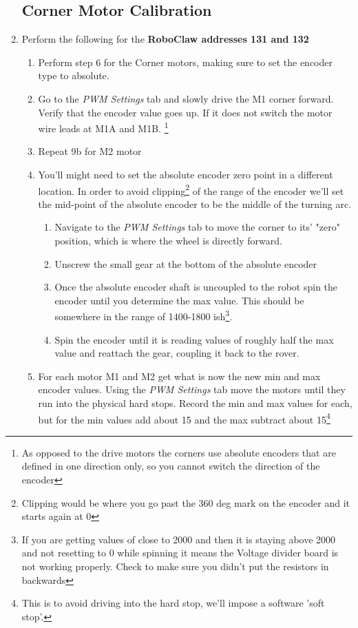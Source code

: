 \documentclass[12pt]{article}
\begin{document}
\begin{enumerate}
\subsection{Corner Motor Calibration}
	\item Perform the following for the \textbf{RoboClaw addresses 131 and 132}
	\begin{enumerate}
		\item Perform step 6 for the Corner motors, making sure to set the encoder type to absolute. 
		\item Go to the \textit{PWM Settings} tab and slowly drive the M1 corner forward. Verify that the encoder value goes up. If it does not switch the motor wire leads at M1A and M1B. \footnote{As opposed to the drive motors the corners use absolute encoders that are defined in one direction only, so you cannot switch the direction of the encoder}
		\item Repeat 9b for M2 motor
		\item You'll might need to set the absolute encoder zero point in a different location. In order to avoid clipping\footnote{Clipping would be where you go past the 360 deg mark on the encoder and it starts again at 0} of the range of the encoder we'll set the mid-point of the absolute encoder to be the middle of the turning arc. 
		\begin{enumerate} 
			\item Navigate to the \textit{PWM Settings} tab to move the corner to its' "zero" position, which is where the wheel is directly forward. 
			\item Unscrew the small gear at the bottom of the absolute encoder
			\item Once the absolute encoder shaft is uncoupled to the robot spin the encoder until you determine the max value. This should be somewhere in the range of 1400-1800 ish\footnote{If you are getting values of close to 2000 and then it is staying above 2000 and not resetting to 0 while spinning it means the Voltage divider board is not working properly. Check to make sure you didn't put the resistors in backwards}.
			\item Spin the encoder until it is reading values of roughly half the max value and reattach the gear, coupling it back to the rover. 
		\end{enumerate}
		
		\item For each motor M1 and M2 get what is now the new min and max encoder values. Using the \textit{PWM Settings} tab move the motors until they run into the physical hard stops. Record the min and max values for each, but for the min values add about 15 and the max subtract about 15\footnote{This is to avoid driving into the hard stop, we'll impose a software 'soft stop'.}
		

\end{enumerate}
\end{enumerate}
\end{document}
